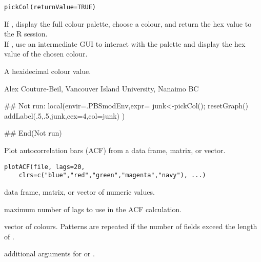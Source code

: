 \documentclass[letterpaper]{book}
\begin{document}
%
\begin{Usage}
\begin{verbatim}
pickCol(returnValue=TRUE)
\end{verbatim}
\end{Usage}
%
\begin{Arguments}
\begin{ldescription}
\item[\code{returnValue}] If , display the full colour palette, choose a colour, 
and return the hex value to the R session. \\{} If , use an intermediate 
GUI to interact with the palette and display the hex value of the chosen colour.
\end{ldescription}
\end{Arguments}
%
\begin{Value}
 A hexidecimal colour value. 
\end{Value}
%
\begin{Author}\relax
Alex Couture-Beil, Vancouver Island University, Nanaimo BC
\end{Author}
%
\begin{SeeAlso}\relax
\end{SeeAlso}
%
\begin{Examples}
\begin{ExampleCode}
## Not run: 
local(envir=.PBSmodEnv,expr={
  junk<-pickCol(); resetGraph()
  addLabel(.5,.5,junk,cex=4,col=junk)
})

## End(Not run)
\end{ExampleCode}
\end{Examples}
%
\begin{Description}\relax
Plot autocorrelation bars (ACF) from a data frame, matrix, or vector.
\end{Description}
%
\begin{Usage}
\begin{verbatim}
plotACF(file, lags=20, 
    clrs=c("blue","red","green","magenta","navy"), ...)
\end{verbatim}
\end{Usage}
%
\begin{Arguments}
\begin{ldescription}
\item[\code{file}] data frame, matrix, or vector of numeric values.
\item[\code{lags}] maximum number of lags to use in the ACF calculation.
\item[\code{clrs}] vector of colours. Patterns are repeated if the number 
of fields exceed the length of .
\item[\code{...}] additional arguments for  or .
\end{ldescription}
\end{Arguments}
\end{document}
